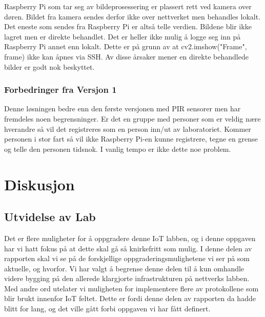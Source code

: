 \documentclass{article}
\begin{document}
Raspberry Pi som tar seg av bildeprosessering er plassert rett ved kamera over døren. Bildet fra kamera sendes derfor ikke over nettverket men behandles lokalt. Det eneste som sendes fra Raspberry Pi er altså telle verdien. Bildene blir ikke lagret men er direkte behandlet. Det er heller ikke mulig å logge seg inn på Raspberry Pi annet enn lokalt. Dette er på grunn av at cv2.imshow("Frame", frame) ikke kan åpnes via SSH. Av disse årsaker mener en direkte behandlede bilder er godt nok beskyttet. 

\subsubsection{Forbedringer fra Versjon 1}
Denne løsningen bedre enn den første versjonen med PIR sensorer men har fremdeles noen begrensninger. Er det en gruppe med personer som er veldig nære hverandre så vil det registreres som en person inn/ut av laboratoriet. Kommer personen i stor fart så vil ikke Raspberry Pi-en kunne registrere, tegne en grense og telle den personen tidsnok. I vanlig tempo er ikke dette noe problem. 







\newpage
\section{Diskusjon}

\subsection{Utvidelse av Lab}

Det er flere muligheter for å oppgradere denne IoT labben, og i denne oppgaven har vi hatt fokus på at dette skal gå så knirkefritt som mulig. I denne delen av rapporten skal vi se på de forskjellige oppgraderingsmulighetene vi ser på som aktuelle, og hvorfor. Vi har valgt å begrense denne delen til å kun omhandle videre bygging på den allerede klargjorte infrastrukturen på nettverks labben. Med andre ord utelater vi muligheten for  implementere flere av protokollene som blir brukt innenfor IoT feltet. Dette er fordi denne delen av rapporten da hadde blitt for lang, og det ville gått forbi oppgaven vi har fått definert. 
\end{document}
